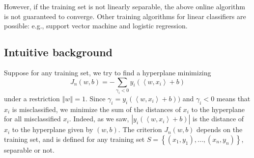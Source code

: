 \documentclass[11pt,twoside]{article}%
\theoremstyle{change}
\begin{document}
However, if the training set is not linearly separable, the above online
algorithm is not guaranteed to converge. Other training algorithms for linear
classifiers are possible: e.g., support vector machine and logistic regression.

\subsection{Intuitive background}

Suppose for any training set, we try to find a hyperplane minimizing
\begin{equation}
J_{n}(w,b)=-\sum_{\gamma_{i}<0}y_{i}\left(  \left\langle w,x_{i}\right\rangle
+b\right) \label{target-function}%
\end{equation}
under a restriction $\left\Vert w\right\Vert =1$. Since $\gamma_{i}%
=y_{i}\left(  \left\langle w,x_{i}\right\rangle +b\right)  )$ and $\gamma
_{i}<0$ means that $x_{i}$ is misclassified, we minimize the sum of the
distances of $x_{i}$ to the hyperplane for all misclassified $x_{i}$. Indeed,
as we saw, $\left\vert y_{i}\left(  \left\langle w,x_{i}\right\rangle
+b\right)  \right\vert $ is the distance of $x_{i}$ to the hyperplane given by
$\left(  w,b\right)  $. The criterion $J_{n}(w,b)$ depends on the training
set, and is defined for any training set $S=\left\{  \left(  x_{1}%
,y_{1}\right)  ,\ldots,\left(  x_{n},y_{n}\right)  \right\}  $, separable or not.
\end{document}
